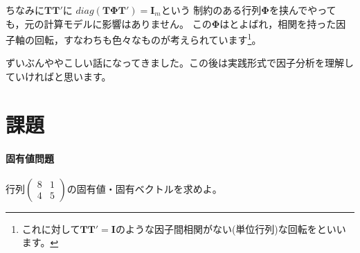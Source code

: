 \documentclass{ltjsbook}
\begin{document}
ちなみに$\bm{TT'}$に
$diag(\bm{T\Phi T'})=\bm{I}_m$という
制約のある行列$\bm{\Phi}$を挟んでやっても，元の計算モデルに影響はありません。
この$\bm{\Phi}$はとよばれ，相関を持った因子軸の回転，すなわちも色々なものが考えられています\footnote{これに対して$\bm{TT'}=\bm{I}$のような因子間相関がない(単位行列)な回転をといいます。}。


ずいぶんややこしい話になってきました。この後は実践形式で因子分析を理解していければと思います。

\section{課題}
\paragraph{固有値問題}行列$\begin{pmatrix}8&1\\4&5\end{pmatrix}$の固有値・固有ベクトルを求めよ。
\end{document}
